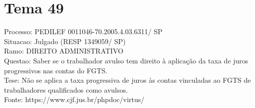 \documentclass[12pt]{article}
\begin{document}
\section*{Tema 49}
Processo: PEDILEF 0011046-70.2005.4.03.6311/ SP\\
Situacao: Julgado (RESP 1349059/ SP)\\
Ramo: DIREITO ADMINISTRATIVO\\
Questao: Saber se o trabalhador avulso tem direito à aplicação da taxa de juros progressivos nas contas do FGTS.\\
Tese: Não se aplica a taxa progressiva de juros às contas vinculadas ao FGTS de trabalhadores qualificados como avulsos.\\
Fonte: https://www.cjf.jus.br/phpdoc/virtus/
\end{document}
